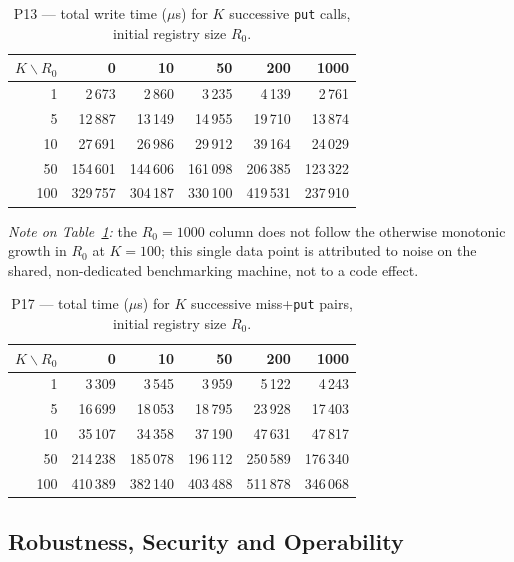 \begin{table}[htbp]
  \centering
  \caption{P13 --- total write time (\(\mu\)s) for $K$ successive \texttt{put} calls, initial
  registry size $R_0$.}
  \label{tab:eval-p13}
  \begin{tabular}{rrrrrr}
    \hline
    $K\backslash R_0$ & 0 & 10 & 50 & 200 & 1000 \\
    \hline
    1   & 2\,673   & 2\,860   & 3\,235   & 4\,139   & 2\,761   \\
    5   & 12\,887  & 13\,149  & 14\,955  & 19\,710  & 13\,874  \\
    10  & 27\,691  & 26\,986  & 29\,912  & 39\,164  & 24\,029  \\
    50  & 154\,601 & 144\,606 & 161\,098 & 206\,385 & 123\,322 \\
    100 & 329\,757 & 304\,187 & 330\,100 & 419\,531 & 237\,910 \\
    \hline
  \end{tabular}
\end{table}

\emph{Note on Table~\ref{tab:eval-p13}:} the $R_0{=}1000$ column does not follow the otherwise
monotonic growth in $R_0$ at $K{=}100$; this single data point is attributed to noise on the
shared, non-dedicated benchmarking machine, not to a code effect.

\begin{table}[htbp]
  \centering
  \caption{P17 --- total time (\(\mu\)s) for $K$ successive miss+\texttt{put} pairs, initial
  registry size $R_0$.}
  \label{tab:eval-p17}
  \begin{tabular}{rrrrrr}
    \hline
    $K\backslash R_0$ & 0 & 10 & 50 & 200 & 1000 \\
    \hline
    1   & 3\,309   & 3\,545   & 3\,959   & 5\,122   & 4\,243   \\
    5   & 16\,699  & 18\,053  & 18\,795  & 23\,928  & 17\,403  \\
    10  & 35\,107  & 34\,358  & 37\,190  & 47\,631  & 47\,817  \\
    50  & 214\,238 & 185\,078 & 196\,112 & 250\,589 & 176\,340 \\
    100 & 410\,389 & 382\,140 & 403\,488 & 511\,878 & 346\,068 \\
    \hline
  \end{tabular}
\end{table}

\subsection{Robustness, Security and Operability}

